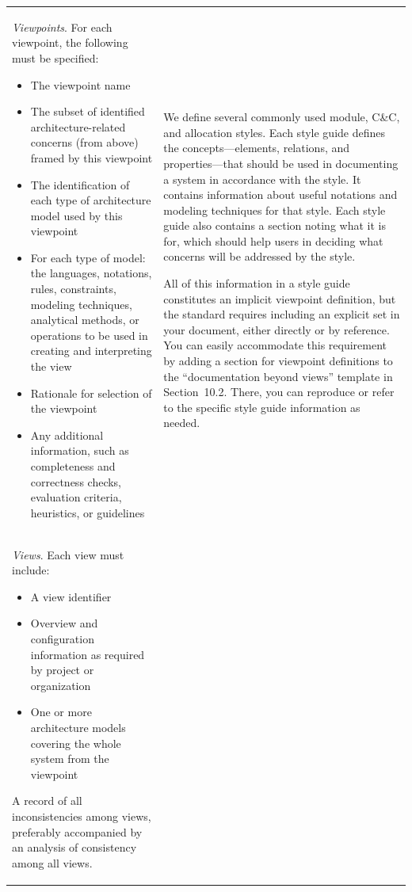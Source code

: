 \documentclass[11pt]{article}
\begin{document}
\begin{longtable}{@{}%
  >{\raggedright\arraybackslash}p{}%
  >{\raggedright\arraybackslash}p{}@{}}
\textit{Viewpoints}. For each viewpoint, the following must be specified:
\begin{itemize}
  \item The viewpoint name
  \item The subset of identified architecture-related concerns (from above)
        framed by this viewpoint
  \item The identification of each type of architecture model used by this
        viewpoint
  \item For each type of model: the languages, notations, rules, constraints,
        modeling techniques, analytical methods, or operations to be used in
        creating and interpreting the view
  \item Rationale for selection of the viewpoint
  \item Any additional information, such as completeness and correctness
        checks, evaluation criteria, heuristics, or guidelines
\end{itemize}
&
We define several commonly used module, C\&C, and allocation styles. Each
style guide defines the concepts---elements, relations, and
properties---that should be used in documenting a system in accordance with
the style. It contains information about useful notations and modeling
techniques for that style. Each style guide also contains a section noting
what it is for, which should help users in deciding what concerns will be
addressed by the style.

All of this information in a style guide constitutes an implicit viewpoint
definition, but the standard requires including an explicit set in your
document, either directly or by reference. You can easily accommodate this
requirement by adding a section for viewpoint definitions to the
``documentation beyond views'' template in Section~10.2. There, you can
reproduce or refer to the specific style guide information as needed. \\
\addlinespace[0.6em]

\textit{Views}. Each view must include:
\begin{itemize}
  \item A view identifier
  \item Overview and configuration information as required by project or
        organization
  \item One or more architecture models covering the whole system from the
        viewpoint
\end{itemize}
A record of all inconsistencies among views, preferably accompanied by an
analysis of consistency among all views.


\end{longtable}
\end{document}
